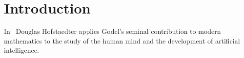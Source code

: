 \section{Introduction}
In~\cite{Hofstadter:1979} Douglas Hofstaedter applies Godel's seminal contribution to modern mathematics to the study of the human mind and the development of artificial intelligence.
